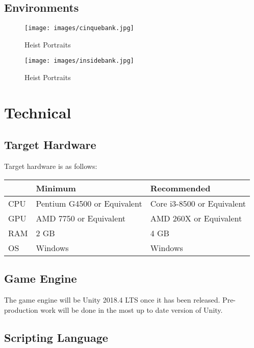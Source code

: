 \documentclass[11pt]{report}
\begin{document}
\section{Environments}

\begin{figure}[H]
    \centering
	\texttt{[image: images/cinquebank.jpg]}
    \caption{Heist Portraits}
\end{figure}

\begin{figure}[H]
    \centering
	\texttt{[image: images/insidebank.jpg]}
    \caption{Heist Portraits}
\end{figure}


\chapter{Technical}

\section{Target Hardware}

Target hardware is as follows:

\begin{center}
    \begin{tabular}{|l|l|l|}
        \hline
        & Minimum & Recommended \\ \hline
        CPU & Pentium G4500 or Equivalent & Core i3-8500 or Equivalent \\ \hline
        GPU & AMD 7750 or Equivalent & AMD 260X or Equivalent \\ \hline
        RAM & 2 GB & 4 GB \\ \hline
        OS & Windows & Windows \\
        \hline
    \end{tabular}
\end{center}

\section{Game Engine}

The game engine will be Unity 2018.4 LTS once it has been released. Pre-production work will be done in the most up to date version of Unity.

\section{Scripting Language}
\end{document}
